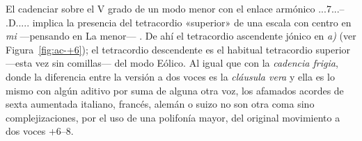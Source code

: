 \documentclass[a4paper,11pt]{article}
\begin{document}
\begin{multicols}{2}
El cadenciar sobre el V grado de un modo menor con el enlace armónico \acorde.\DD..7...-- \acorde.D..... implica la presencia del tetracordio «superior» de una escala con centro en \emph{mi} ---pensando en La menor--- . De ahí el tetracordio ascendente jónico en \emph{a)} (ver Figura~\ref{fig:ac-+6}); el tetracordio descendente  es el habitual tetracordio superior ---esta vez sin comillas--- del modo Eólico. Al igual que con la \emph{cadencia frigia}, donde la diferencia entre la versión a dos voces es la \emph{cláusula vera} y ella es lo mismo con algún aditivo por suma de alguna otra voz, los afamados acordes de sexta aumentada italiano, francés, alemán o suizo no son otra coma sino complejizaciones, por el uso de una polifonía mayor, del original movimiento a dos voces +6--8.
\end{multicols}
\end{document}
